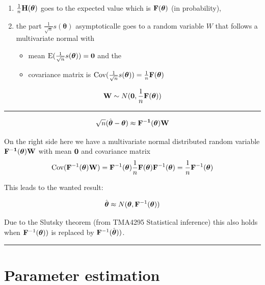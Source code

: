 \documentclass[
]{article}
\providecommand{\tightlist}{%
  \setlength{\itemsep}{0pt}\setlength{\parskip}{0pt}}
\begin{document}
\begin{enumerate}
\def\labelenumi{\arabic{enumi})}
\item
  \(\frac{1}{n}{\bf H}(\boldsymbol{\theta})\) goes to the expected value
  which is \({\bf F}(\boldsymbol{\theta})\) (in probability),
\item
  the part \(\frac{1}{\sqrt{n}}s({\boldsymbol{\theta}})\) asymptoticalle
  goes to a random variable \(W\) that follows a multivariate normal
  with

  \begin{itemize}
  \tightlist
  \item
    mean
    \(\text{E}(\frac{1}{\sqrt{n}}s({\boldsymbol{\theta}}))={\bf 0}\) and
    the
  \item
    covariance matrix is
    \(\text{Cov}(\frac{1}{\sqrt{n}}s({\boldsymbol{\theta}}))=\frac{1}{n}{\bf F}(\boldsymbol{\theta})\)
  \end{itemize}
\end{enumerate}

\[ {\bf W} \sim N({\bf 0},\frac{1}{n}{\bf F}(\boldsymbol{\theta}))\]

\begin{center}\rule{0.5\linewidth}{0.5pt}\end{center}

\[\sqrt{n}(\hat{\boldsymbol{\theta}}-{\boldsymbol{\theta}}) \approx \bf{F}^{-1}(\boldsymbol{\theta}){\bf W}\]

On the right side here we have a multivariate normal distributed random
variable \(\bf{F}^{-1}(\boldsymbol{\theta}){\bf W}\) with mean
\({\bf 0}\) and covariance matrix
\[\text{Cov}({\bf F}^{-1}(\boldsymbol{\theta}){\bf W})={\bf F}^{-1}(\boldsymbol{\theta})\frac{1}{n}{\bf F}(\boldsymbol{\theta}){\bf F}^{-1}(\boldsymbol{\theta})=\frac{1}{n}{\bf F}^{-1}(\boldsymbol{\theta})\]

This leads to the wanted result:

\[ \hat{\boldsymbol{\theta}}\approx N(\boldsymbol{\theta},{\bf F}^{-1}(\boldsymbol{\theta}))\]

Due to the Slutsky theorem (from TMA4295 Statistical inference) this
also holds when \({\bf F}^{-1}(\boldsymbol{\theta}))\) is replaced by
\({\bf F}^{-1}(\hat{\boldsymbol{\theta}}))\).

\begin{center}\rule{0.5\linewidth}{0.5pt}\end{center}

\hypertarget{parameter-estimation}{%
\section{Parameter estimation}\label{parameter-estimation}}
\end{document}

